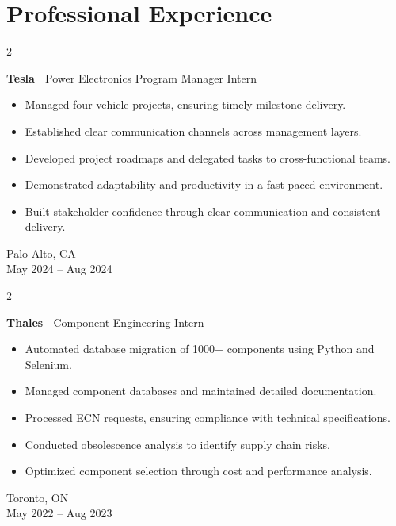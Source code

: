 \documentclass[10pt, letterpaper]{article}
\newenvironment{highlights}{
    \begin{itemize}[
        topsep=0.10 cm,
        parsep=0.10 cm,
        partopsep=0pt,
        itemsep=0pt,
        leftmargin=0.4 cm + 10pt
    ]
}{
    \end{itemize}
} %
\newenvironment{twocolentry}[2][]{
    \onecolentry
    \def\secondColumn{#2}
    \setcolumnwidth{\fill, 4.5 cm}
    \begin{paracol}{2}
}{
    \switchcolumn \raggedleft \secondColumn
    \end{paracol}
    \endonecolentry
} %
\begin{document}
    \section{Professional Experience}
        \begin{twocolentry}{Palo Alto, CA \\ May 2024 – Aug 2024}
            \textbf{Tesla} | Power Electronics Program Manager Intern
            \begin{highlights}
                \item Managed four vehicle projects, ensuring timely milestone delivery.
                \item Established clear communication channels across management layers.
                \item Developed project roadmaps and delegated tasks to cross-functional teams.
                \item Demonstrated adaptability and productivity in a fast-paced environment.
                \item Built stakeholder confidence through clear communication and consistent delivery.
            \end{highlights}
        \end{twocolentry}

        \vspace{0.2 cm}

        \begin{twocolentry}{Toronto, ON \\ May 2022 – Aug 2023}
            \textbf{Thales} | Component Engineering Intern
            \begin{highlights}
                \item Automated database migration of 1000+ components using Python and Selenium.
                \item Managed component databases and maintained detailed documentation.
                \item Processed ECN requests, ensuring compliance with technical specifications.
                \item Conducted obsolescence analysis to identify supply chain risks.
                \item Optimized component selection through cost and performance analysis.
            \end{highlights}
        \end{twocolentry}

        \vspace{0.1 cm} %
\end{document}
